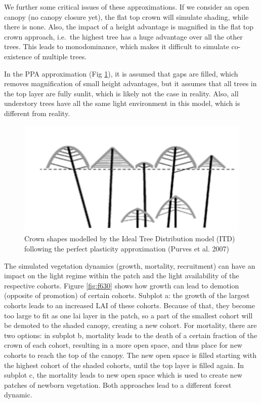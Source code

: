 \documentclass[12pt,oneside]{book}
\begin{document}
We further some critical issues of these approximations. If we consider
an open canopy (no canopy closure yet), the flat top crown will simulate
shading, while there is none. Also, the impact of a height advantage is
magnified in the flat top crown approach, i.e.~the highest tree has a
huge advantage over all the other trees. This leads to monodominance,
which makes it difficult to simulate co-existence of multiple trees.

In the PPA approximation (Fig \ref{fig:f629}), it is assumed that gaps
are filled, which removes magnification of small height advantages, but
it assumes that all trees in the top layer are fully sunlit, which is
likely not the case in reality. Also, all understory trees have all the
same light environment in this model, which is different from reality.

\begin{figure}

{\centering \includegraphics[width=0.8\linewidth]{figures/chap6/f629_ppa_purves} 

}

\caption{Crown shapes modelled by the Ideal Tree Distribution model (ITD) following the perfect plasticity approximation (Purves et al. 2007)}\label{fig:f629}
\end{figure}

The simulated vegetation dynamics (growth, mortality, recruitment) can
have an impact on the light regime within the patch and the light
availability of the respective cohorts. Figure \ref{fig:f630} shows how
growth can lead to demotion (opposite of promotion) of certain cohorts.
Subplot a: the growth of the largest cohorts leads to an increased LAI
of these cohorts. Because of that, they become too large to fit as one
lai layer in the patch, so a part of the smallest cohort will be demoted
to the shaded canopy, creating a new cohort. For mortality, there are
two options: in subplot b, mortality leads to the death of a certain
fraction of the crown of each cohort, resulting in a more open space,
and thus place for new cohorts to reach the top of the canopy. The new
open space is filled starting with the highest cohort of the shaded
cohorts, until the top layer is filled again. In subplot c, the
mortality leads to new open space which is used to create new patches of
newborn vegetation. Both approaches lead to a different forest dynamic.
\end{document}
